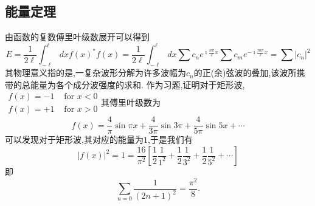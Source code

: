 \subsection{能量定理}
由函数的复数傅里叶级数展开可以得到
\begin{equation}
  E = \frac{1}{2\ell} \int_{-\ell}^{\ell} dx f(x)^* f(x) 
 = \frac{1}{2\ell} \int_{-\ell}^{\ell} dx  \sum c_n e^{\imath \frac{n\pi}{\ell} x} \sum c_m e^{-\imath \frac{m\pi}{\ell} x}
 = \sum |c_n|^2
\end{equation}
其物理意义指的是,一复杂波形分解为许多波幅为$c_n$的正(余)弦波的叠加,该波所携带的总能量为各个成分波强度的求和.
作为习题,证明对于矩形波,
$\begin{array}{ll}f(x)=-1 & \text { for } x<0 \\ f(x)=+1 & \text { for } x>0\end{array}$其傅里叶级数为
$$
f(x)=\frac{4}{\pi} \sin \pi x+\frac{4}{3 \pi} \sin 3 \pi+\frac{4}{5 \pi} \sin 5 x+\cdots
$$
可以发现对于矩形波,其对应的能量为$1$,于是我们有
$$
|f(x)|^2=1=\frac{16}{\pi^2}\left[\frac{1}{2} \frac{1}{1^2}+\frac{1}{2} \frac{1}{3^2}+\frac{1}{2} \frac{1}{5^2}+\cdots\right]
$$
即
\[
\sum_{n=0} \frac{1}{(2n+1)^2} = \frac{\pi^2}{8} .
\]